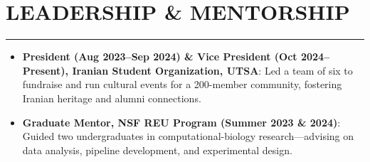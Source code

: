 \documentclass[9pt,letterpaper]{extarticle}
\newcommand{\sectionsep}{%
  \par
  \vspace{-3ex}%
  \noindent\rule{\textwidth}{0.4pt}%
  \vspace{0ex}%
  \par
}
\begin{document}
\section*{LEADERSHIP \& MENTORSHIP}
\sectionsep
\begin{itemize}
  \item \textbf{President (Aug 2023--Sep 2024) \& Vice President (Oct 2024--Present), Iranian Student Organization, UTSA}: Led a team of six to fundraise and run cultural events for a 200-member community, fostering Iranian heritage and alumni connections.
  \item \textbf{Graduate Mentor, NSF REU Program (Summer 2023 \& 2024)}: Guided two undergraduates in computational-biology research—advising on data analysis, pipeline development, and experimental design.
\end{itemize}
\end{document}
